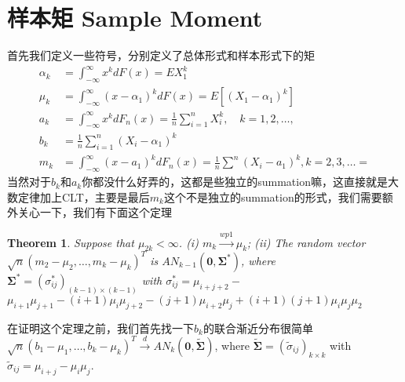 \documentclass{article}
\newtheorem{theorem}{Theorem}[section]
\begin{document}
\section{样本矩 Sample Moment}
首先我们定义一些符号，分别定义了总体形式和样本形式下的矩
$$
\begin{aligned}
	\alpha_k & =\int_{-\infty}^{\infty} x^k d F(x)=E X_1^k \\
	\mu_k & =\int_{-\infty}^{\infty}\left(x-\alpha_1\right)^k d F(x)=E\left[\left(X_1-\alpha_1\right)^k\right]\\
	a_k & =\int_{-\infty}^{\infty} x^k d F_n(x)=\frac{1}{n} \sum_{i=1}^n X_i^k, \quad k=1,2, \ldots, \\
	b_k&=\frac{1}{n} \sum_{i=1}^n\left(X_i-\alpha_1\right)^k\\
	m_k & =\int_{-\infty}^{\infty}\left(x-a_1\right)^k d F_n(x)=\frac{1}{n} \sum^n\left(X_i-a_1\right)^k, k=2,3, \ldots=
\end{aligned}
$$
当然对于$b_k$和$a_k$你都没什么好弄的，这都是些独立的summation嘛，这直接就是大数定律加上CLT，主要是最后$m_k$这个不是独立的summation的形式，我们需要额外关心一下，我们有下面这个定理
\begin{theorem}
	Suppose that $\mu_{2 k}<\infty$.
	(i) $m_k \stackrel{w p 1}{\rightarrow} \mu_k$;
	(ii) The random vector $\sqrt{n}\left(m_2-\mu_2, \ldots, m_k-\mu_k\right)^T$ is $A N_{k-1}\left(\mathbf{0}, \boldsymbol{\Sigma}^*\right)$, where $\boldsymbol{\Sigma}^*=\left(\sigma_{i j}^*\right)_{(k-1) \times(k-1)}$ with $\sigma_{i j}^*=\mu_{i+j+2}-$ $\mu_{i+1} \mu_{j+1}-(i+1) \mu_i \mu_{j+2}-(j+1) \mu_{i+2} \mu_j+(i+1)(j+1) \mu_i \mu_j \mu_2$
\end{theorem}
在证明这个定理之前，我们首先找一下$b_k$的联合渐近分布很简单$\sqrt{n}\left(b_1-\mu_1, \ldots, b_k-\mu_k\right)^T\stackrel{d}{\rightarrow}A N_k(\mathbf{0}, \widetilde{\boldsymbol{\Sigma}})$, where $\widetilde{\boldsymbol{\Sigma}}=\left(\widetilde{\sigma}_{i j}\right)_{k \times k}$ with $\widetilde{\sigma}_{i j}=\mu_{i+j}-\mu_i \mu_j$.
\end{document}
